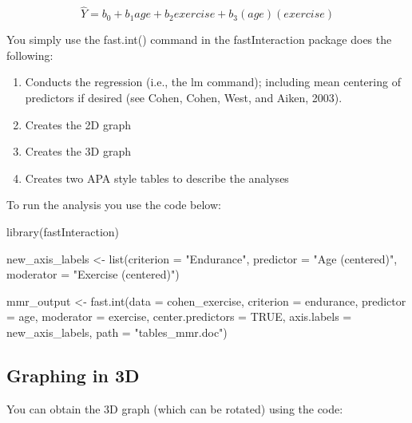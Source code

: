 \documentclass[
]{krantz}
\makeatletter
\newenvironment{Shaded}{\begin{snugshade}}{\end{snugshade}}
\newcommand{\AttributeTok}[1]{\textcolor[rgb]{0.61,0.61,0.61}{#1}}
\newcommand{\ConstantTok}[1]{\textcolor[rgb]{0,0,0}{#1}}
\newcommand{\FunctionTok}[1]{\textcolor[rgb]{0,0,0}{#1}}
\newcommand{\NormalTok}[1]{#1}
\newcommand{\OtherTok}[1]{\textcolor[rgb]{0.37,0.37,0.37}{#1}}
\newcommand{\StringTok}[1]{\textcolor[rgb]{0.5,0.5,0.5}{#1}}
\newenvironment{kframe}{%
\medskip{}
\setlength{\fboxsep}{.8em}
 \def\at@end@of@kframe{}%
 \ifinner\ifhmode%
  \def\at@end@of@kframe{\end{minipage}}%
  \begin{minipage}{\columnwidth}%
 \fi\fi%
 \def\FrameCommand##1{\hskip\@totalleftmargin \hskip-\fboxsep
 \colorbox{shadecolor}{##1}\hskip-\fboxsep
     \hskip-\linewidth \hskip-\@totalleftmargin \hskip\columnwidth}%
 \MakeFramed {\advance\hsize-\width
   \@totalleftmargin\z@ \linewidth\hsize
   \@setminipage}}%
 {\par\unskip\endMakeFramed%
 \at@end@of@kframe}
\renewenvironment{Shaded}{\begin{kframe}}{\end{kframe}}
\makeatother
\begin{document}
\[ \hat{Y} = b_0 + b_1age + b_2exercise + b_3(age)(exercise)\]

You simply use the fast.int() command in the fastInteraction package does the following:

\begin{enumerate}
\def\labelenumi{\arabic{enumi}.}
\item
  Conducts the regression (i.e., the lm command); including mean centering of predictors if desired (see Cohen, Cohen, West, and Aiken, 2003).
\item
  Creates the 2D graph
\item
  Creates the 3D graph
\item
  Creates two APA style tables to describe the analyses
\end{enumerate}

To run the analysis you use the code below:

\begin{Shaded}
\begin{Highlighting}[]
\FunctionTok{library}\NormalTok{(fastInteraction)}

\NormalTok{new\_axis\_labels }\OtherTok{\textless{}{-}} \FunctionTok{list}\NormalTok{(}\AttributeTok{criterion =} \StringTok{"Endurance"}\NormalTok{,}
                        \AttributeTok{predictor =} \StringTok{"Age (centered)"}\NormalTok{,}
                        \AttributeTok{moderator =} \StringTok{"Exercise (centered)"}\NormalTok{)}

\NormalTok{mmr\_output }\OtherTok{\textless{}{-}} \FunctionTok{fast.int}\NormalTok{(}\AttributeTok{data =}\NormalTok{ cohen\_exercise,}
                       \AttributeTok{criterion =}\NormalTok{ endurance,}
                       \AttributeTok{predictor =}\NormalTok{ age,}
                       \AttributeTok{moderator =}\NormalTok{ exercise,}
                       \AttributeTok{center.predictors =} \ConstantTok{TRUE}\NormalTok{,}
                       \AttributeTok{axis.labels =}\NormalTok{ new\_axis\_labels,}
                       \AttributeTok{path =} \StringTok{"tables\_mmr.doc"}\NormalTok{)}
\end{Highlighting}
\end{Shaded}

\hypertarget{graphing-in-3d}{%
\subsection{Graphing in 3D}\label{graphing-in-3d}}

You can obtain the 3D graph (which can be rotated) using the code:
\end{document}
